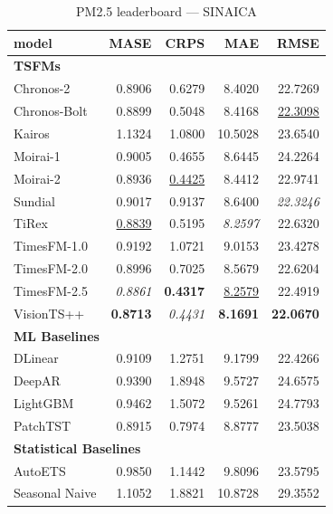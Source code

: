 \begin{table}[H]
\caption{PM2.5 leaderboard --- SINAICA}
\centering
\begin{small}
\begin{tabular}{lrrrr}
\toprule
model & MASE & CRPS & MAE & RMSE \\
\midrule
\multicolumn{5}{l}{\textbf{TSFMs}} \\
Chronos-2 & 0.8906 & 0.6279 & 8.4020 & 22.7269 \\
Chronos-Bolt & 0.8899 & 0.5048 & 8.4168 & \underline{22.3098} \\
Kairos & 1.1324 & 1.0800 & 10.5028 & 23.6540 \\
Moirai-1 & 0.9005 & 0.4655 & 8.6445 & 24.2264 \\
Moirai-2 & 0.8936 & \underline{0.4425} & 8.4412 & 22.9741 \\
Sundial & 0.9017 & 0.9137 & 8.6400 & \textit{22.3246} \\
TiRex & \underline{0.8839} & 0.5195 & \textit{8.2597} & 22.6320 \\
TimesFM-1.0 & 0.9192 & 1.0721 & 9.0153 & 23.4278 \\
TimesFM-2.0 & 0.8996 & 0.7025 & 8.5679 & 22.6204 \\
TimesFM-2.5 & \textit{0.8861} & \textbf{0.4317} & \underline{8.2579} & 22.4919 \\
VisionTS++ & \textbf{0.8713} & \textit{0.4431} & \textbf{8.1691} & \textbf{22.0670} \\
\midrule
\multicolumn{5}{l}{\textbf{ML Baselines}} \\
DLinear & 0.9109 & 1.2751 & 9.1799 & 22.4266 \\
DeepAR & 0.9390 & 1.8948 & 9.5727 & 24.6575 \\
LightGBM & 0.9462 & 1.5072 & 9.5261 & 24.7793 \\
PatchTST & 0.8915 & 0.7974 & 8.8777 & 23.5038 \\
\midrule
\multicolumn{5}{l}{\textbf{Statistical Baselines}} \\
AutoETS & 0.9850 & 1.1442 & 9.8096 & 23.5795 \\
Seasonal Naive & 1.1052 & 1.8821 & 10.8728 & 29.3552 \\
\bottomrule
\end{tabular}
\end{small}
\end{table}